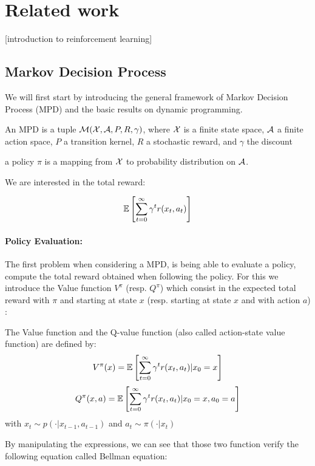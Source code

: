 \section{Related work}

[introduction to reinforcement learning]

\subsection{Markov Decision Process}
We will first start by introducing the general framework of Markov Decision Process (MPD) and the basic results on dynamic programming.

\begin{definition}
An MPD is a tuple $\mathcal{M}(\mathcal{X}, \mathcal{A}, P, R, \gamma)$, where $\mathcal{X}$ is a finite state space, $\mathcal{A}$ a finite action space, $P$ a transition kernel, $R$ a stochastic reward, and $\gamma$ the discount
\end{definition}

a policy $\pi$ is a mapping from $\mathcal{X}$ to probability distribution on $\mathcal{A}$.

We are interested in the total reward: 

\[ \mathbb{E}\left[ \sum_{t=0}^\infty  \gamma^t r(x_t, a_t) \right] \]

\paragraph{Policy Evaluation:} The first problem when considering a MPD, is being able to evaluate a policy, \ie compute the total reward obtained when following the policy. For this we introduce the Value function $V^\pi$ (resp. $Q^\pi$) which consist in the expected total reward with $\pi$ and starting at state $x$ (resp. starting at state $x$ and with action $a$) :

\begin{definition}
The Value function and the Q-value function (also called action-state value function) are defined by:
\[ V^\pi(x) = \mathbb{E}\left[ \sum_{t=0}^\infty  \gamma^t r(x_t, a_t) | x_0 = x \right]  \]
\[ Q^\pi(x,a) = \mathbb{E}\left[ \sum_{t=0}^\infty  \gamma^t r(x_t, a_t) | x_0 = x, a_0 = a \right]  \] 
with $x_t \sim p(\cdot | x_{t-1}, a_{t-1})$ and $a_t \sim \pi(\cdot | x_t)$
\end{definition}

By manipulating the expressions, we can see that those two function verify the following equation called Bellman equation:

